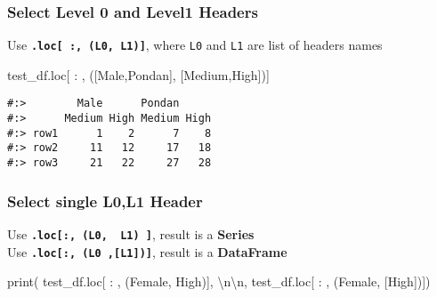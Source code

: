 \documentclass[
]{book}
\newenvironment{Shaded}{\begin{snugshade}}{\end{snugshade}}
\newcommand{\BuiltInTok}[1]{#1}
\newcommand{\CharTok}[1]{\textcolor[rgb]{0.5,0.5,0.5}{#1}}
\newcommand{\NormalTok}[1]{#1}
\newcommand{\StringTok}[1]{\textcolor[rgb]{0.5,0.5,0.5}{#1}}
\begin{document}
\hypertarget{select-level-0-and-level1-headers}{%
\subsubsection{Select Level 0 and Level1 Headers}\label{select-level-0-and-level1-headers}}

Use \textbf{\texttt{.loc{[}\ :,\ (L0,\ L1){]}}}, where \texttt{L0} and \texttt{L1} are list of headers names

\begin{Shaded}
\begin{Highlighting}[]
\NormalTok{test\_df.loc[ : , ([}\StringTok{\textquotesingle{}Male\textquotesingle{}}\NormalTok{,}\StringTok{\textquotesingle{}Pondan\textquotesingle{}}\NormalTok{], [}\StringTok{\textquotesingle{}Medium\textquotesingle{}}\NormalTok{,}\StringTok{\textquotesingle{}High\textquotesingle{}}\NormalTok{])]}
\end{Highlighting}
\end{Shaded}

\begin{verbatim}
#:>        Male      Pondan     
#:>      Medium High Medium High
#:> row1      1    2      7    8
#:> row2     11   12     17   18
#:> row3     21   22     27   28
\end{verbatim}

\hypertarget{select-single-l0l1-header}{%
\subsubsection{Select single L0,L1 Header}\label{select-single-l0l1-header}}

Use \textbf{\texttt{.loc{[}:,\ (L0,\ \ L1)\ {]}}}, result is a \textbf{Series}\\
Use \textbf{\texttt{.loc{[}:,\ (L0\ ,{[}L1{]}){]}}}, result is a \textbf{DataFrame}

\begin{Shaded}
\begin{Highlighting}[]
\BuiltInTok{print}\NormalTok{( test\_df.loc[ : , (}\StringTok{\textquotesingle{}Female\textquotesingle{}}\NormalTok{, }\StringTok{\textquotesingle{}High\textquotesingle{}}\NormalTok{)], }\StringTok{\textquotesingle{}}\CharTok{\textbackslash{}n\textbackslash{}n}\StringTok{\textquotesingle{}}\NormalTok{,}
\NormalTok{       test\_df.loc[ : , (}\StringTok{\textquotesingle{}Female\textquotesingle{}}\NormalTok{, [}\StringTok{\textquotesingle{}High\textquotesingle{}}\NormalTok{])])}
\end{Highlighting}
\end{Shaded}
\end{document}
